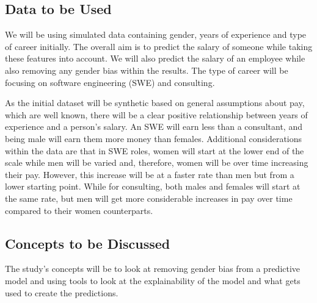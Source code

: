 \documentclass{sigchi}
\begin{document}
\subsection{Data to be Used}
We will be using simulated data containing gender, years of experience and type of career initially. The overall aim is to predict the salary of someone while taking these features into account. We will also predict the salary of an employee while also removing any gender bias within the results. The type of career will be focusing on software engineering (SWE) and consulting.

As the initial dataset will be synthetic based on general assumptions about pay, which are well known, there will be a clear positive relationship between years of experience and a person's salary. An SWE will earn less than a consultant, and being male will earn them more money than females. Additional considerations within the data are that in SWE roles, women will start at the lower end of the scale while men will be varied and, therefore, women will be over time increasing their pay. However, this increase will be at a faster rate than men but from a lower starting point. While for consulting, both males and females will start at the same rate, but men will get more considerable increases in pay over time compared to their women counterparts.

\subsection{Concepts to be Discussed}

The study's concepts will be to look at removing gender bias from a predictive model and using tools to look at the explainability of the model and what gets used to create the predictions.


\end{document}
